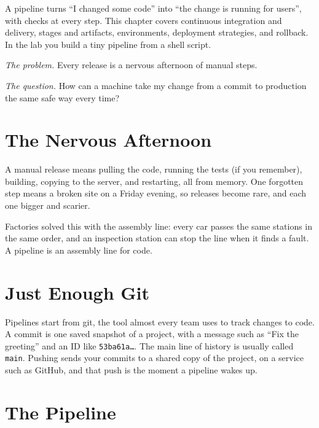 
\begin{chapterintro}

A pipeline turns ``I changed some code'' into ``the change is running for users'', with checks at every step. This chapter covers continuous integration and delivery, stages and artifacts, environments, deployment strategies, and rollback. In the lab you build a tiny pipeline from a shell script.

\end{chapterintro}

\emph{The problem.} Every release is a nervous afternoon of manual steps.

\emph{The question.} How can a machine take my change from a commit to production the same safe way every time?

\section{The Nervous Afternoon}\label{04-pipelines-from-a-commit-to-production:the-nervous-afternoon}

A manual release means pulling the code, running the tests (if you remember), building, copying to the server, and restarting, all from memory. One forgotten step means a broken site on a Friday evening, so releases become rare, and each one bigger and scarier.

Factories solved this with the assembly line: every car passes the same stations in the same order, and an inspection station can stop the line when it finds a fault. A pipeline is an assembly line for code.

\section{Just Enough Git}\label{04-pipelines-from-a-commit-to-production:just-enough-git}

Pipelines start from git, the tool almost every team uses to track changes to code. A commit is one saved snapshot of a project, with a message such as ``Fix the greeting'' and an ID like \texttt{53ba61a…}. The main line of history is usually called \texttt{main}. Pushing sends your commits to a shared copy of the project, on a service such as GitHub, and that push is the moment a pipeline wakes up.

\section{The Pipeline}\label{04-pipelines-from-a-commit-to-production:the-pipeline}

